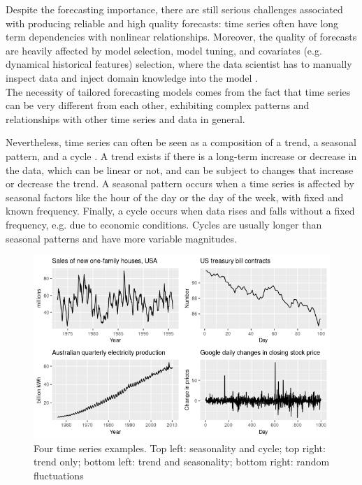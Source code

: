 \documentclass[a4paper, 12pt]{article} %
\begin{document}
	Despite the forecasting importance, there are still serious challenges associated with producing reliable and high quality forecasts: time series often have long term dependencies with nonlinear relationships.  Moreover, the quality of forecasts are heavily affected by model selection, model tuning, and covariates (e.g. dynamical historical features) selection, where the data scientist has to manually inspect data and inject domain knowledge into the model \cite{DeepLearningForecastingSurvey, FacebookProphet}.\\
	The necessity of tailored forecasting models comes from the fact that time series can be very different from each other, exhibiting complex patterns and relationships with other time series and data in general. 
	
	Nevertheless, time series can often be seen as a composition of a trend, a seasonal pattern, and a cycle \cite{ForecastingHyndmanAthanasopoulos}.
	A trend exists if there is a long-term increase or decrease in the data, which can be linear or not, and can be subject to changes that increase or decrease the trend.
	A seasonal pattern occurs when a time series is affected by seasonal factors like the hour of the day or the day of the week, with fixed and known frequency.
	Finally, a cycle occurs when data rises and falls without a fixed frequency, e.g. due to economic conditions.  Cycles are usually longer than seasonal patterns and have more variable magnitudes.
	
	\begin{figure}
	\includegraphics[width=\linewidth]{img/sota_ts_components.png}
	\caption{Four time series examples. Top left: seasonality and cycle; top right: trend only; bottom left: trend and seasonality; bottom right: random fluctuations}
	\end{figure}
	
\end{document}
